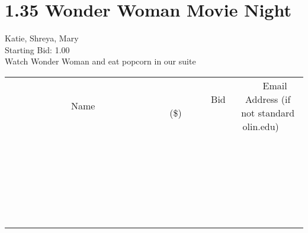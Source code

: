 \documentclass[11pt]{article}
\begin{document}
					\section*{1.35 Wonder Woman Movie Night}
					Katie, Shreya, Mary \\
					Starting Bid: 1.00 \\
					Watch Wonder Woman and eat popcorn in our suite \\
					[6ex]
					\begin{tabular}{c c c}
						~~~~~~~~~~~~~Name~~~~~~~~~~~~~ & ~~~~~~~~~Bid (\$)~~~~~~~~~ & ~~~Email Address (if not standard olin.edu)~~~ \\
				
 & & \\
\hline
 & & \\
\hline
 & & \\
\hline
 & & \\
\hline
 & & \\
\hline
 & & \\
\hline
 & & \\
\hline
 & & \\
\hline
 & & \\
\hline
 & & \\
\hline
 & & \\
\hline
 & & \\
\hline
 & & \\
\hline
 & & \\
\hline
 & & \\
\hline
 & & \\
\hline
 & & \\
\hline
 & & \\
\hline
 & & \\
\hline
 & & \\
\hline
 & & \\
\hline
 & & \\
\hline
 & & \\
\hline
 & & \\
\hline
 & & \\
\hline
 & & \\
\hline
					\end{tabular}
					\clearpage
				
\end{document}
